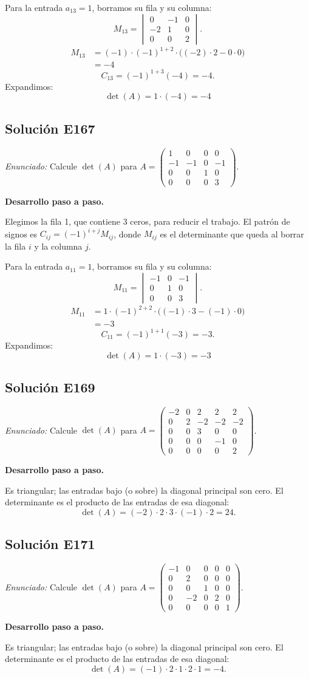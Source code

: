 \documentclass[12pt]{article}
\theoremstyle{remark}
\newcommand{\solucion}[2]{\Needspace{11\baselineskip}\subsection*{Solución E#1}\noindent\textit{Enunciado:} #2\par\medskip\noindent\textbf{Desarrollo paso a paso.}\par\medskip}
\begin{document}
Para la entrada $a_{13}=1$, borramos su fila y su columna:
\[
M_{13}=\begin{vmatrix}0&-1&0\\-2&1&0\\0&0&2\end{vmatrix}.
\]
\[
\begin{aligned}M_{13}&=(-1)\cdot (-1)^{1+2}\cdot\bigl((-2)\cdot 2-0\cdot 0\bigr)\\&=-4\end{aligned}
\]
\[
C_{13}=(-1)^{1+3}(-4)=-4.
\]
Expandimos: \[
\boxed{\det(A)=1\cdot (-4)=-4}
\]

\medskip

\solucion{167}{Calcule $\det(A)$ para $A=\begin{pmatrix}1&0&0&0\\-1&-1&0&-1\\0&0&1&0\\0&0&0&3\end{pmatrix}$.}
Elegimos la fila 1, que contiene 3 ceros, para reducir el trabajo. El patrón de signos es $C_{ij}=(-1)^{i+j}M_{ij}$, donde $M_{ij}$ es el determinante que queda al borrar la fila $i$ y la columna $j$.

Para la entrada $a_{11}=1$, borramos su fila y su columna:
\[
M_{11}=\begin{vmatrix}-1&0&-1\\0&1&0\\0&0&3\end{vmatrix}.
\]
\[
\begin{aligned}M_{11}&=1\cdot (-1)^{2+2}\cdot\bigl((-1)\cdot 3-(-1)\cdot 0\bigr)\\&=-3\end{aligned}
\]
\[
C_{11}=(-1)^{1+1}(-3)=-3.
\]
Expandimos: \[
\boxed{\det(A)=1\cdot (-3)=-3}
\]

\medskip

\solucion{169}{Calcule $\det(A)$ para $A=\begin{pmatrix}-2&0&2&2&2\\0&2&-2&-2&-2\\0&0&3&0&0\\0&0&0&-1&0\\0&0&0&0&2\end{pmatrix}$.}
Es triangular; las entradas bajo (o sobre) la diagonal principal son cero. El determinante es el producto de las entradas de esa diagonal:
\[
\det(A)=(-2)\cdot 2\cdot 3\cdot (-1)\cdot 2=24.
\]

\medskip

\solucion{171}{Calcule $\det(A)$ para $A=\begin{pmatrix}-1&0&0&0&0\\0&2&0&0&0\\0&0&1&0&0\\0&-2&0&2&0\\0&0&0&0&1\end{pmatrix}$.}
Es triangular; las entradas bajo (o sobre) la diagonal principal son cero. El determinante es el producto de las entradas de esa diagonal:
\[
\det(A)=(-1)\cdot 2\cdot 1\cdot 2\cdot 1=-4.
\]
\end{document}
